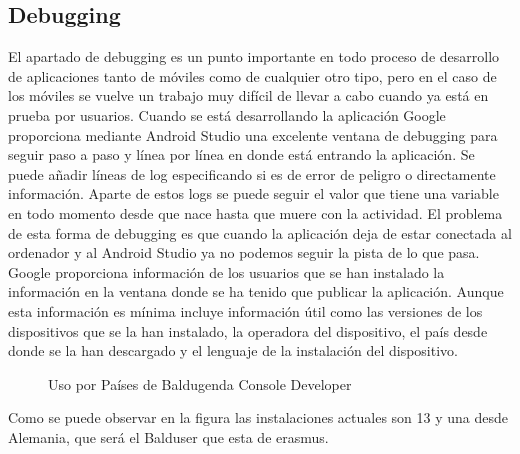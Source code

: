 \subsection{Debugging}
\label{subsecc:Debugging}

El apartado de debugging es un punto importante en todo proceso de desarrollo de aplicaciones tanto de móviles como de cualquier otro tipo, pero en el caso de los móviles se vuelve un trabajo muy difícil de llevar a cabo cuando ya está en prueba por usuarios.
Cuando se está desarrollando la aplicación Google proporciona mediante Android Studio una excelente ventana de debugging para seguir paso a paso y  línea por línea en donde está entrando la aplicación.
Se puede añadir líneas de log especificando si es de error de peligro o directamente información. Aparte de estos logs se puede seguir el valor que tiene una variable en todo momento desde que nace hasta que muere con la actividad.
El problema de esta forma de debugging es que cuando la aplicación deja de estar conectada al ordenador y al Android Studio ya no podemos seguir la pista de lo que pasa.
Google proporciona información de los usuarios que se han instalado la información en la ventana donde se ha tenido que publicar la aplicación. Aunque esta información es mínima incluye información útil como las versiones de los dispositivos que se la han instalado, la operadora del dispositivo, el país desde donde se la han descargado y el lenguaje de la instalación del dispositivo.

\begin{figure}[H] 
  \begin{center} 
    \caption{Uso por Países de Baldugenda Console Developer} 
    \label{fig:UsoPorPaises} 
  \end{center} 
\end{figure}

Como se puede observar en la figura las instalaciones actuales son 13 y una desde Alemania, que será el Balduser que esta de erasmus.

